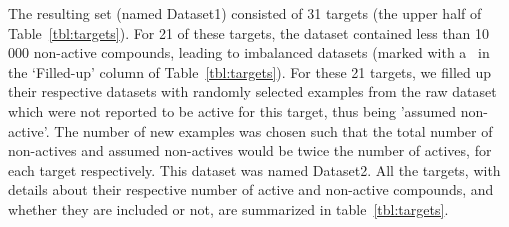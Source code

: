 \documentclass[10pt,article]{memoir}
\begin{document}
The resulting set (named Dataset1) consisted of 31 targets (the upper half of Table~\ref{tbl:targets}).
For 21 of these targets, the dataset contained less than 10\,000 non-active
compounds, leading to imbalanced datasets (marked with a \checkmark\ in the
`Filled-up' column of Table~\ref{tbl:targets}).
%
For these 21 targets, we filled up their respective datasets with randomly
selected examples from the raw dataset which were not reported to be active for
this target, thus being 'assumed non-active'. The number of new examples was chosen such that the total number of non-actives and
assumed non-actives would be twice the number of actives, for each target
respectively. This dataset was named Dataset2.
%
All the targets, with details about their respective number of active
and non-active compounds, and whether they are included or not, are summarized
in table~\ref{tbl:targets}.
\end{document}
